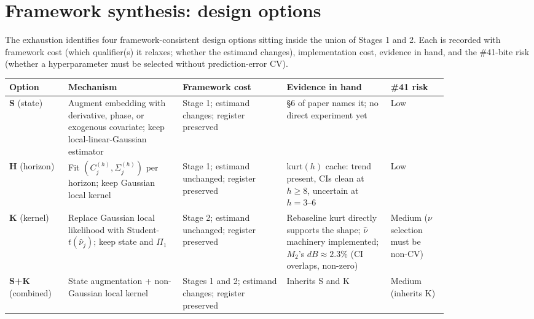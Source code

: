 \documentclass[11pt]{article}
\newcommand{\nuhat}{\hat\nu}
\begin{document}
\section{Framework synthesis: design options}
\label{sec:framework-synthesis}

The exhaustion identifies four framework-consistent design options
sitting inside the union of Stages 1 and 2. Each is recorded with
framework cost (which qualifier(s) it relaxes; whether the estimand
changes), implementation cost, evidence in hand, and the \#41-bite
risk (whether a hyperparameter must be selected without
prediction-error CV).

\begin{center}\small
\begin{tabular}{P{0.10\linewidth} P{0.22\linewidth} P{0.20\linewidth} P{0.20\linewidth} P{0.11\linewidth}}
\toprule
Option & Mechanism & Framework cost & Evidence in hand & \#41 risk \\
\midrule
\textbf{S} (state)
& Augment embedding with derivative, phase, or exogenous covariate;
keep local-linear-Gaussian estimator
& Stage 1; estimand changes; register preserved
& \S6 of paper names it; no direct experiment yet
& Low \\
\midrule
\textbf{H} (horizon)
& Fit \((C_j^{(h)}, \Sigma_j^{(h)})\) per horizon; keep Gaussian
local kernel
& Stage 1; estimand unchanged; register preserved
& kurt\((h)\) cache: trend present, CIs clean at \(h{\geq}8\),
uncertain at \(h{=}3\)--\(6\)
& Low \\
\midrule
\textbf{K} (kernel)
& Replace Gaussian local likelihood with Student-\(t(\nuhat_j)\);
keep state and \(\Pi_1\)
& Stage 2; estimand unchanged; register preserved
& Rebaseline kurt directly supports the shape; \(\nuhat\) machinery
implemented; \(M_2\)'s \(dB \approx 2.3\%\) (CI overlaps, non-zero)
& Medium (\(\nu\) selection must be non-CV) \\
\midrule
\textbf{S+K} (combined)
& State augmentation + non-Gaussian local kernel
& Stages 1 and 2; estimand changes; register preserved
& Inherits S and K
& Medium (inherits K) \\
\bottomrule
\end{tabular}
\end{center}
\end{document}
